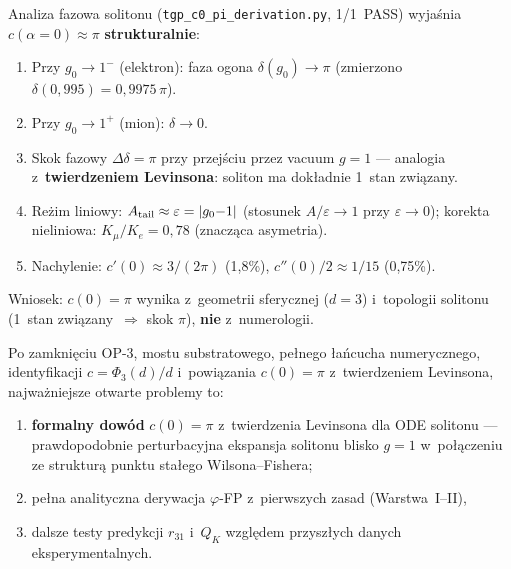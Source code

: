 \begin{remark}[Levinson i~pochodzenie $c(0) = \pi$]
\label{rem:Z-levinson}
Analiza fazowa solitonu (\texttt{tgp\_c0\_pi\_derivation.py}, 1/1~PASS)
wyja\'snia $c(\alpha{=}0) \approx \pi$ \textbf{strukturalnie}:
\begin{enumerate}[nosep]
  \item Przy $g_0 \to 1^-$ (elektron): faza ogona
    $\delta(g_0) \to \pi$ (zmierzono $\delta(0{,}995) = 0{,}9975\,\pi$).
  \item Przy $g_0 \to 1^+$ (mion): $\delta \to 0$.
  \item Skok fazowy $\Delta\delta = \pi$ przy przej\'sciu
    przez vacuum $g{=}1$ --- analogia z~\textbf{twierdzeniem Levinsona}:
    soliton ma dok\l{}adnie 1~stan zwi\k{a}zany.
  \item Re\.zim liniowy: $A_{\rm tail} \approx \varepsilon = |g_0{-}1|$
    (stosunek $A/\varepsilon \to 1$ przy $\varepsilon \to 0$);
    korekta nieliniowa: $K_\mu/K_e = 0{,}78$ (znacz\k{a}ca asymetria).
  \item Nachylenie: $c'(0) \approx 3/(2\pi)$ (1{,}8\%),
    $c''(0)/2 \approx 1/15$ (0{,}75\%).
\end{enumerate}
Wniosek: $c(0) = \pi$ wynika z~geometrii sferycznej ($d = 3$)
i~topologii solitonu (1~stan zwi\k{a}zany~$\Rightarrow$ skok $\pi$),
\textbf{nie} z~numerologii.
\end{remark}

\begin{remark}
Po zamkni\k{e}ciu OP-3, mostu substratowego, pe\l{}nego \l{}a\'ncucha numerycznego,
identyfikacji $c = \Phi_3(d)/d$ i~powi\k{a}zania $c(0){=}\pi$
z~twierdzeniem Levinsona,
najwa\.zniejsze otwarte problemy to:
\begin{enumerate}[nosep]
  \item \textbf{formalny dow\'od} $c(0) = \pi$
    z~twierdzenia Levinsona dla ODE solitonu ---
    prawdopodobnie perturbacyjna ekspansja solitonu
    blisko $g{=}1$ w~po\l{}\k{a}czeniu ze struktur\k{a}
    punktu sta\l{}ego Wilsona--Fishera;
  \item pe\l{}na analityczna derywacja $\varphi$-FP
    z~pierwszych zasad (Warstwa~I--II),
  \item dalsze testy predykcji $r_{31}$ i~$Q_K$
    wzgl\k{e}dem przysz\l{}ych danych eksperymentalnych.
\end{enumerate}
\end{remark}
